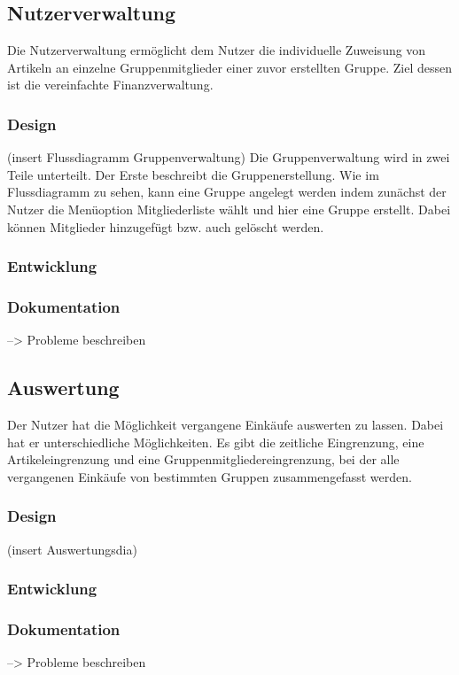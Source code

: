 \documentclass[12pt,a4paper]{article}
\begin{document}
\subsection{Nutzerverwaltung}
Die Nutzerverwaltung ermöglicht dem Nutzer die individuelle Zuweisung von Artikeln an einzelne Gruppenmitglieder einer zuvor erstellten Gruppe. Ziel dessen ist die vereinfachte Finanzverwaltung.

\subsubsection*{Design}
(insert Flussdiagramm Gruppenverwaltung)
Die Gruppenverwaltung wird in zwei Teile unterteilt. Der Erste beschreibt die Gruppenerstellung. Wie im Flussdiagramm zu sehen, kann eine Gruppe angelegt werden indem zunächst der Nutzer die Menüoption Mitgliederliste wählt und hier eine Gruppe erstellt. Dabei können Mitglieder hinzugefügt bzw. auch gelöscht werden.
\subsubsection*{Entwicklung}

\subsubsection*{Dokumentation} --> Probleme beschreiben
\newpage

\subsection{Auswertung}
Der Nutzer hat die Möglichkeit vergangene Einkäufe auswerten zu lassen. Dabei hat er unterschiedliche Möglichkeiten.  Es gibt die zeitliche Eingrenzung, eine Artikeleingrenzung und eine Gruppenmitgliedereingrenzung, bei der alle vergangenen Einkäufe von bestimmten Gruppen zusammengefasst werden.
\subsubsection*{Design}
(insert Auswertungsdia)
\subsubsection*{Entwicklung}

\subsubsection*{Dokumentation} --> Probleme beschreiben
\newpage
\end{document}
